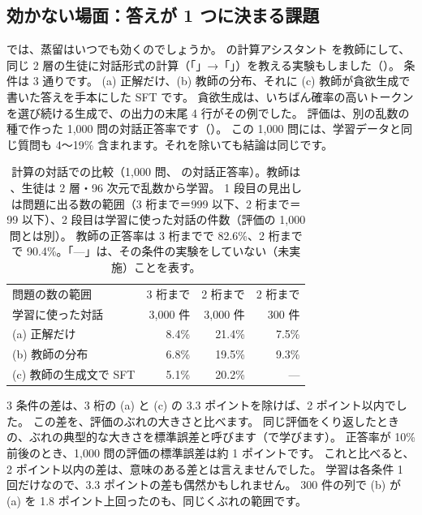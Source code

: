 \subsection{効かない場面：答えが 1 つに決まる課題}\label{sec:distill-exp-drill}

では、蒸留はいつでも効くのでしょうか。
の計算アシスタント  を教師にして、同じ 2 層の生徒に対話形式の計算（「」→「」）を教える実験もしました（）。
条件は 3 通りです。
(a) 正解だけ、(b) 教師の分布、それに (c) 教師が貪欲生成で書いた答えを手本にした SFT です。
貪欲生成は、いちばん確率の高いトークンを選び続ける生成で、の出力の末尾 4 行がその例でした。
評価は、別の乱数の種で作った 1,000 問の対話正答率です（）。
この 1,000 問には、学習データと同じ質問も 4〜19\% 含まれます。それを除いても結論は同じです。

\begin{table}[tbp]
\centering
\caption{計算の対話での比較（1,000 問、 の対話正答率）。教師は 、生徒は 2 層・96 次元で乱数から学習。
1 段目の見出しは問題に出る数の範囲（3 桁まで＝999 以下、2 桁まで＝99 以下）、2 段目は学習に使った対話の件数（評価の 1,000 問とは別）。
教師の正答率は 3 桁までで 82.6\%、2 桁までで 90.4\%。「—」は、その条件の実験をしていない（未実施）ことを表す。}
\label{tab:distill-drill}
\begin{tabular}{lrrr}
\toprule
問題の数の範囲 & 3 桁まで & 2 桁まで & 2 桁まで \\
学習に使った対話 & 3,000 件 & 3,000 件 & 300 件 \\
\midrule
(a) 正解だけ & 8.4\% & 21.4\% & 7.5\% \\
(b) 教師の分布 & 6.8\% & 19.5\% & 9.3\% \\
(c) 教師の生成文で SFT & 5.1\% & 20.2\% & — \\
\bottomrule
\end{tabular}
\end{table}

3 条件の差は、3 桁の (a) と (c) の 3.3 ポイントを除けば、2 ポイント以内でした。
この差を、評価のぶれの大きさと比べます。
同じ評価をくり返したときの、ぶれの典型的な大きさを標準誤差と呼びます（で学びます）。
正答率が 10\% 前後のとき、1,000 問の評価の標準誤差は約 1 ポイントです。
これと比べると、2 ポイント以内の差は、意味のある差とは言えませんでした。
学習は各条件 1 回だけなので、3.3 ポイントの差も偶然かもしれません。
300 件の列で (b) が (a) を 1.8 ポイント上回ったのも、同じくぶれの範囲です。

